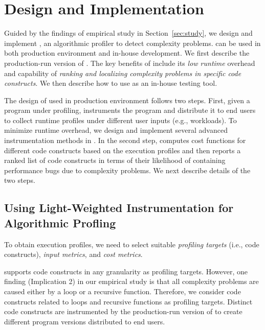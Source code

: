 \section{\Tool Design and Implementation}
\label{sec:online}


Guided by the findings of empirical study in Section~\ref{sec:study},
we design and implement \Tool, an algorithmic
profiler to detect complexity problems. \Tool
can be used in both production environment 
and in-house development. We first describe
the production-run version of \Tool. 
The key benefits of \Tool include its \emph{low runtime} 
overhead and capability of \emph{ranking 
and localizing complexity problems in specific code constructs}. 
We then describe how to use \Tool as an in-house testing tool. 

The design of \Tool used in production environment 
follows two steps. First, given a program under profiling,
\Tool instruments the program and
distribute it to end users to collect runtime profiles
under different user inputs (e.g., workloads). 
To minimize runtime overhead, we design and implement
several advanced instrumentation methods in \Tool. 
In the second step, \Tool computes cost functions for
different code constructs based on the execution profiles
and then reports a ranked list of code constructs in
terms of their likelihood of containing performance bugs due to
complexity problems.  
We next describe details of the two steps. 


\subsection{Using Light-Weighted Instrumentation 
for Algorithmic Profling}
\label{sec:opt}

To obtain execution profiles, we need to select suitable 
\emph{profiling targets} (i.e.,
code constructs), \emph{input metrics}, and \emph{cost metrics}. 

\Tool supports code constructs in any granularity as profiling targets. 
However, one finding (Implication 2) in our empirical study is 
that all complexity problems are 
caused either by a loop or a recursive function. 
Therefore, we consider code constructs related 
to loops and recursive functions as profiling targets. 
Distinct code constructs are instrumented by the production-run
version of \Tool to create different program versions distributed
to end users.

